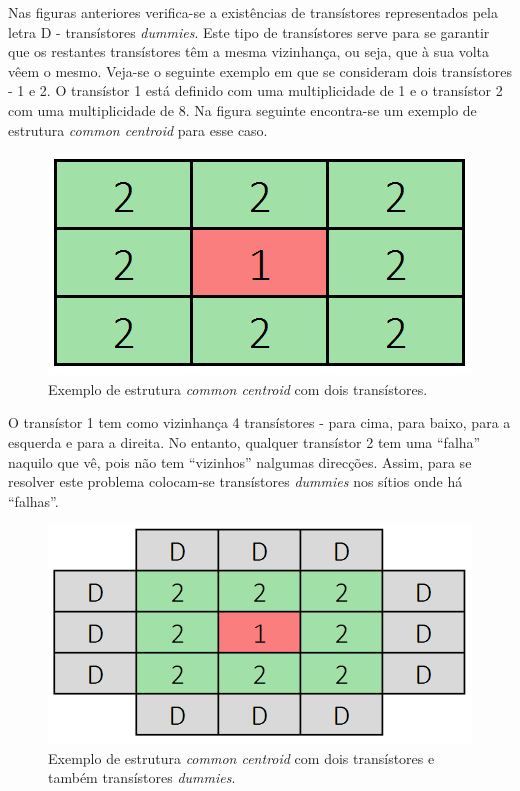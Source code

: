 \documentclass[11pt]{article}
\numberwithin{equation}{section}
\begin{document}
Nas figuras anteriores verifica-se a existências de transístores representados pela letra D - transístores \textit{dummies}. Este tipo de transístores serve para se garantir que os restantes transístores têm a mesma vizinhança, ou seja, que à sua volta vêem o mesmo. Veja-se o seguinte exemplo em que se consideram dois transístores - 1 e 2. O transístor 1 está definido com uma multiplicidade de 1 e o transístor 2 com uma multiplicidade de 8. Na figura seguinte encontra-se um exemplo de estrutura \textit{common centroid} para esse caso. 

\begin{figure}[H]
	\centering
	\includegraphics[keepaspectratio=true, scale=0.35]{teoricas/dummy1}
	\vspace{-0.5em}
	\caption{Exemplo de estrutura \textit{common centroid} com dois transístores.}
	\vspace{-0.8em}
\end{figure} 

O transístor 1 tem como vizinhança 4 transístores - para cima, para baixo, para a esquerda e para a direita. No entanto, qualquer transístor 2 tem uma ``falha'' naquilo que vê, pois não tem ``vizinhos'' nalgumas direcções. Assim, para se resolver este problema colocam-se transístores \textit{dummies} nos sítios onde há ``falhas''.

\begin{figure}[H]
	\centering
	\includegraphics[keepaspectratio=true, scale=0.35]{teoricas/dummy2}
	\vspace{-0.5em}
	\caption{Exemplo de estrutura \textit{common centroid} com dois transístores e também transístores \textit{dummies}.}
	\vspace{-0.8em}
\end{figure}
\end{document}

